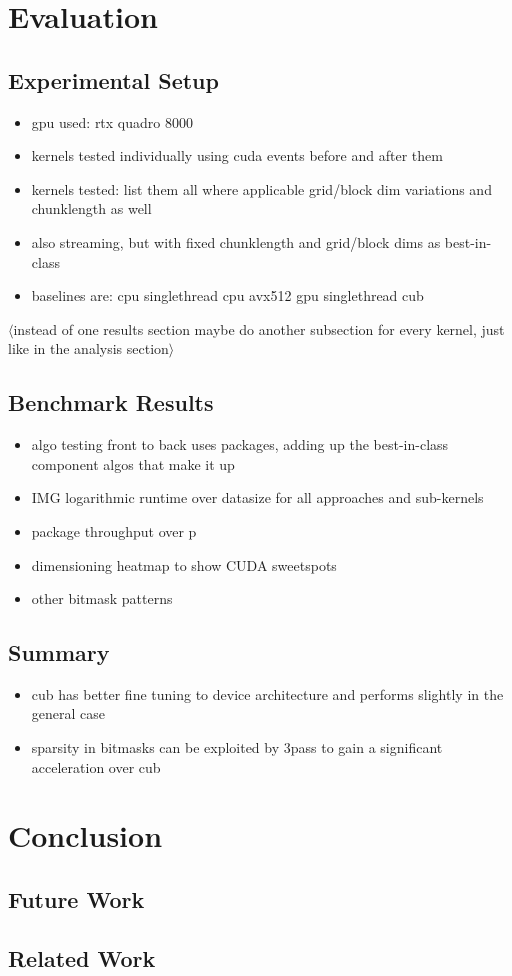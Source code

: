 \documentclass{tudscrreprt}
\newcommand{\markr}[1]{\textcolor{review}{$\langle$#1$\rangle$}}
\begin{document}
	\section{Evaluation}
	
		\subsection{Experimental Setup}
			\begin{itemize}
				\item gpu used: rtx quadro 8000
				\item kernels tested individually using cuda events before and after them
				\item kernels tested: list them all
					\subitem where applicable grid/block dim variations and chunklength as well
				\item also streaming, but with fixed chunklength and grid/block dims as best-in-class
				\item baselines are:
					\subitem cpu singlethread
					\subitem cpu avx512
					\subitem gpu singlethread
					\subitem cub
			\end{itemize}
		
		\markr{instead of one results section maybe do another subsection for every kernel, just like in the analysis section}
		
		\subsection{Benchmark Results}
			\begin{itemize}
				\item algo testing front to back uses packages, adding up the best-in-class component algos that make it up
				\item IMG logarithmic runtime over datasize for all approaches and sub-kernels
				\item package throughput over p
				\item dimensioning heatmap to show CUDA sweetspots
				\item other bitmask patterns
			\end{itemize}
		
		\subsection{Summary}
		
			\begin{itemize}
				\item cub has better fine tuning to device architecture and performs slightly in the general case
				\item sparsity in bitmasks can be exploited by 3pass to gain a significant acceleration over cub
			\end{itemize}
		
	\section{Conclusion}
	
		\subsection{Future Work}
	
		\subsection{Related Work}
	
\end{document}

